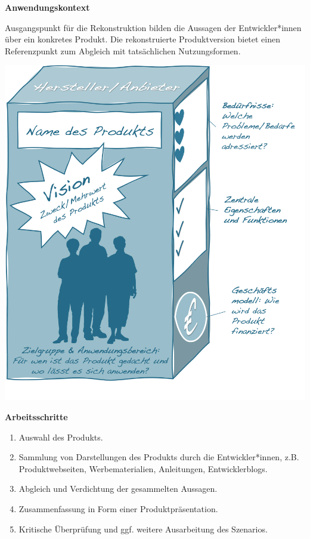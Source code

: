 \documentclass[
  a4paper,
]{book}
\providecommand{\tightlist}{%
  \setlength{\itemsep}{0pt}\setlength{\parskip}{0pt}}
\begin{document}
\textbf{Anwendungskontext}

Ausgangspunkt für die Rekonstruktion bilden die Aussagen der Entwickler*innen über ein konkretes Produkt. Die rekonstruierte Produktversion bietet einen Referenzpunkt zum Abgleich mit tatsächlichen Nutzungsformen.

\begin{center}\includegraphics{Figures/08-05-Produktvision} \end{center}

\textbf{Arbeitsschritte}

\begin{enumerate}
\def\labelenumi{\arabic{enumi}.}
\tightlist
\item
  Auswahl des Produkts.
\item
  Sammlung von Darstellungen des Produkts durch die Entwickler*innen, z.B. Produktwebseiten, Werbematerialien, Anleitungen, Entwicklerblogs.
\item
  Abgleich und Verdichtung der gesammelten Aussagen.
\item
  Zusammenfassung in Form einer Produktpräsentation.
\item
  Kritische Überprüfung und ggf. weitere Ausarbeitung des Szenarios.
\end{enumerate}
\end{document}
